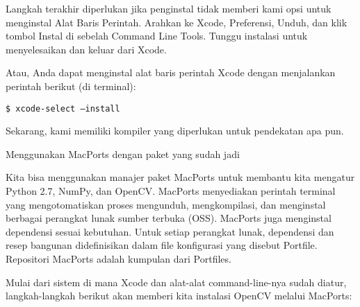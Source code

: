 Langkah terakhir diperlukan jika penginstal tidak memberi kami opsi untuk menginstal Alat Baris Perintah. Arahkan ke Xcode, Preferensi, Unduh, dan klik tombol Instal di sebelah Command Line Tools. Tunggu instalasi untuk menyelesaikan dan keluar dari Xcode.

Atau, Anda dapat menginstal alat baris perintah Xcode dengan menjalankan perintah berikut (di terminal):
\begin{verbatim}
$ xcode-select –install
\end{verbatim}
Sekarang, kami memiliki kompiler yang diperlukan untuk pendekatan apa pun.

Menggunakan MacPorts dengan paket yang sudah jadi

Kita bisa menggunakan manajer paket MacPorts untuk membantu kita mengatur Python 2.7, NumPy, dan OpenCV. MacPorts menyediakan perintah terminal yang mengotomatiskan proses mengunduh, mengkompilasi, dan menginstal berbagai perangkat lunak sumber terbuka (OSS). MacPorts juga menginstal dependensi sesuai kebutuhan. Untuk setiap perangkat lunak, dependensi dan resep bangunan didefinisikan dalam file konfigurasi yang disebut Portfile. Repositori MacPorts adalah kumpulan dari Portfiles.

Mulai dari sistem di mana Xcode dan alat-alat command-line-nya sudah diatur, langkah-langkah berikut akan memberi kita instalasi OpenCV melalui MacPorts:

